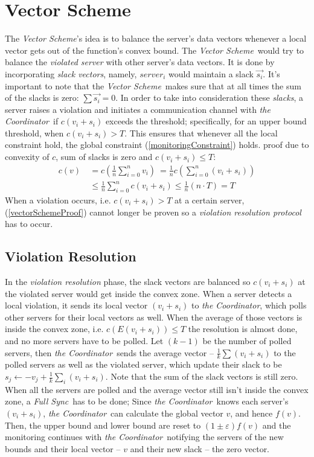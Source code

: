 \documentclass[10pt, conference]{IEEEtran}
\newcommand{\vectorScheme}{\textit{Vector Scheme}}
\newcommand{\fullSync}{\textit{Full Sync}}
\newcommand{\theCoordinator}{\textit{the Coordinator}}
\begin{document}
\section{Vector Scheme}
The \vectorScheme 's idea is to balance the server's data vectors whenever a local vector gets out of the function's convex bound. The \vectorScheme \ would try to balance the \textit{violated server} with other server's data vectors. It is done by incorporating \textit{slack vectors}, namely, $server_i$ would maintain a slack $\overrightarrow{s_i}$. It's important to note that the \vectorScheme \  makes sure that at all times the sum of the slacks is zero: ${\sum{\overrightarrow{s_i}} = 0}$.
In order to take into consideration these \textit{slacks}, a server raises a violation and initiates a communication channel with \theCoordinator \ if ${c(v_i+s_i)}$ exceeds the threshold; specifically, for an upper bound threshold, when ${c(v_i+s_i) > T}$. This ensures that whenever all the local constraint hold, the global constraint (\ref{monitoringConstraint}) holds. proof due to convexity of $c$, sum of slacks is zero and ${c(v_i+s_i) \leq T}$:
\begin{equation}
\label{vectorSchemeProof}
\begin{aligned}
 c(v)  \
	   &=  c\left(\frac{1}{n} \sum\limits_{i=0}^{n}{v_i}\right)  \
        =  \frac{1}{n} c\left(\sum\limits_{i=0}^{n}{(v_i + s_i)}\right) \\
      &\leq   \frac{1}{n} \sum\limits_{i=0}^{n}{c(v_i + s_i)}
       \leq   \frac{1}{n}(n \cdot T)
       = T
\end{aligned}
\end{equation}
When a violation occurs, i.e. ${c(v_i+s_i) > T}$ at a certain server, (\ref{vectorSchemeProof}) cannot longer be proven so a \textit{violation resolution protocol} has to occur.
\subsection{Violation Resolution}
In the \textit{violation resolution} phase, the slack vectors are balanced so ${c(v_i+s_i)}$ at the violated server would get inside the convex zone. When a server detects a local violation, it sends its local vector ${(v_i + s_i)}$ to \theCoordinator , which polls other servers for their local vectors as well. When the average of those vectors is inside the convex zone, i.e. ${c(E(v_i + s_i)) \leq T}$ the resolution is almost done, and no more servers have to be polled. Let ${(k-1)}$ be the number of polled servers, then \theCoordinator \ sends the average vector -- ${\frac{1}{k}\sum{(v_i + s_i)}}$ to the polled servers as well as the violated server, which update their slack to be ${s_j \leftarrow -v_j + \frac{1}{k}\sum_i{(v_i + s_i)}}$. Note that the sum of the slack vectors is still zero. \\
When all the servers are polled and the average vector still isn't inside the convex zone, a \fullSync \ has to be done; Since \theCoordinator \ knows each server's ${(v_i + s_i)}$, \theCoordinator \ can calculate the global vector $v$, and hence $f(v)$. Then, the upper bound and lower bound are reset to ${(1 \pm \varepsilon )f(v)}$ and the monitoring continues with \theCoordinator \ notifying the servers of the new bounds and their local vector -- $v$ and their new slack -- the zero vector.
\end{document}
